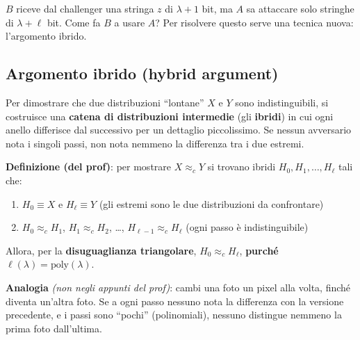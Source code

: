 \(B\) riceve dal challenger una stringa \(z\) di \(\lambda + 1\) bit, ma \(A\) sa attaccare solo stringhe di \(\lambda + \ell\) bit. Come fa \(B\) a usare \(A\)? Per risolvere questo serve una tecnica nuova: l'argomento ibrido.

\subsection{Argomento ibrido (hybrid argument)}

\begin{inbreve}

Per dimostrare che due distribuzioni ``lontane'' \(X\) e \(Y\) sono indistinguibili, si costruisce una \textbf{catena di distribuzioni intermedie} (gli \textbf{ibridi}) in cui ogni anello differisce dal successivo per un dettaglio piccolissimo. Se nessun avversario nota i singoli passi, non nota nemmeno la differenza tra i due estremi.

\end{inbreve}

\textbf{Definizione (del prof)}: per mostrare \(X \approx_c Y\) si trovano ibridi \(H_0, H_1, \dots, H_\ell\) tali che:

\begin{enumerate}
\def\labelenumi{\arabic{enumi}.}
\tightlist
\item
  \(H_0 \equiv X\) e \(H_\ell \equiv Y\) (gli estremi sono le due distribuzioni da confrontare)
\item
  \(H_0 \approx_c H_1\), \(H_1 \approx_c H_2\), \ldots, \(H_{\ell-1} \approx_c H_\ell\) (ogni passo è indistinguibile)
\end{enumerate}

Allora, per la \textbf{disuguaglianza triangolare}, \(H_0 \approx_c H_\ell\), \textbf{purché} \(\ell(\lambda) = \text{poly}(\lambda)\).

\begin{nota}

\textbf{Analogia} \emph{(non negli appunti del prof)}: cambi una foto un pixel alla volta, finché diventa un'altra foto. Se a ogni passo nessuno nota la differenza con la versione precedente, e i passi sono ``pochi'' (polinomiali), nessuno distingue nemmeno la prima foto dall'ultima.

\end{nota}

